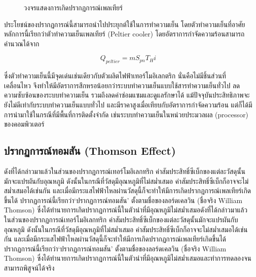 \documentclass[11pt]{article}
\begin{document}
\begin{figure}[h]
  \centering
  \caption{วงจรแสดงการเกิดปรากฏการณ์เพลเทียร์}
\end{figure}

ประโยชน์ของปรากฏการณ์นี้สามารถนำไปประยุกต์ใช้ในการทำความเย็น โดยตัวทำความเย็นที่อาศัยหลักการนี้เรียกว่าตัวทำความเย็นเพลเทียร์ (Peltier cooler) โดยอัตราการกำจัดความร้อนสามารถคำนวณได้จาก

$$ Q_{peltier} = m S_{pn} T_H i $$

ซึ่งตัวทำความเย็นนี้มีจุดเด่นเช่นเดียวกับตัวผลิตไฟฟ้าเทอร์โมอิเลกตริก นั่นคือไม่มีชิ้นส่วนที่เคลื่อนไหว จึงทำให้มีอัตราการสึกหรอน้อยกว่าระบบทำความเย็นแบบใช้สารทำความเย็นทั่วไป ลดความซับซ้อนของระบบทำความเย็น รวมถึงลดค่าซ่อมแซมและดูแลรักษาได้ แม้ปัจจุบันประสิทธิภาพจะยังไม่ดีเท่ากับระบบทำความเย็นแบบทั่วไป และมีราคาสูงเมื่อเทียบกับอัตราการกำจัดความร้อน แต่ก็ได้มีการนำมาใช้ในกรณีที่มีพื้นที่การติดตั้งจำกัด เช่นระบบทำความเย็นในหน่วยประมวลผล (processor) ของคอมพิวเตอร์

\subsection{ปรากฏการณ์ทอมสัน (Thomson Effect)}
\label{sec:orgb13f282}

ดังที่ได้กล่าวมาแล้วในส่วนของปรากฏการณ์เทอร์โมอิเลกทริก ค่าสัมประสิทธิ์ซีเบ็กของแต่ละวัสดุนั้นมักจะแปรผันกับอุณหภูมิ ดังนั้นในกรณีที่วัสดุมีอุณหภูมิที่ไม่สม่ำเสมอ ค่าสัมประสิทธิ์ซีเบ็กก็อาจจะไม่สม่ำเสมอได้เช่นกัน และเมื่อมีกระแสไฟฟ้าไหลผ่านวัสดุนี้ก็จะทำให้มีการเกิดปรากฏการณ์เพลเทียร์เกิดขึ้นได้ ปรากฏการณ์นี้เรียกว่า`ปรากฏการณ์ทอมสัน' ตั้งตามชื่อของลอร์ดเคลวิน (ชื่อจริง William Thomson) ซึ่งได้ทำนายการเกิดปรากฏการณ์นี้ในตัวนำที่มีอุณหภูมิไม่สม่ำเสมอดังที่ได้กล่าวมาแล้วในส่วนของปรากฏการณ์เทอร์โมอิเลกทริก ค่าสัมประสิทธิ์ซีเบ็กของแต่ละวัสดุนั้นมักจะแปรผันกับอุณหภูมิ ดังนั้นในกรณีที่วัสดุมีอุณหภูมิที่ไม่สม่ำเสมอ ค่าสัมประสิทธิ์ซีเบ็กก็อาจจะไม่สม่ำเสมอได้เช่นกัน และเมื่อมีกระแสไฟฟ้าไหลผ่านวัสดุนี้ก็จะทำให้มีการเกิดปรากฏการณ์เพลเทียร์เกิดขึ้นได้ ปรากฏการณ์นี้เรียกว่า`ปรากฏการณ์ทอมสัน' ตั้งตามชื่อของลอร์ดเคลวิน (ชื่อจริง William Thomson) ซึ่งได้ทำนายการเกิดปรากฏการณ์นี้ในตัวนำที่มีอุณหภูมิไม่สม่ำเสมอและทำการทดลองจนสามารถพิสูจน์ได้จริง 
\end{document}
